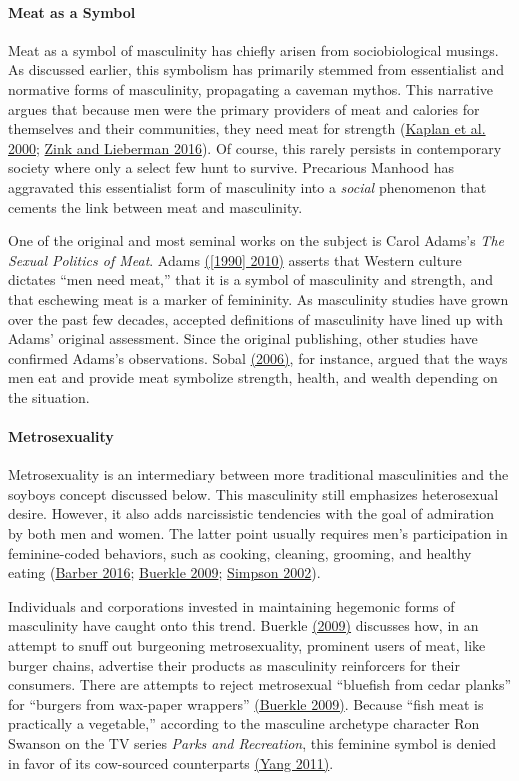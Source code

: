 \documentclass[twoside]{report}
\begin{document}
\paragraph{Meat as a Symbol}

Meat as a symbol of masculinity has chiefly arisen from sociobiological musings. As discussed earlier, this symbolism has primarily stemmed from essentialist and normative forms of masculinity, propagating a caveman mythos. This narrative argues that because men were the primary providers of meat and calories for themselves and their communities, they need meat for strength (\hyperlink{kaplan}{Kaplan et al. 2000}; \hyperlink{zink}{Zink and Lieberman 2016}). Of course, this rarely persists in contemporary society where only a select few hunt to survive. Precarious Manhood has aggravated this essentialist form of masculinity into a \textit{social} phenomenon that cements the link between meat and masculinity.

One of the original and most seminal works on the subject is Carol Adams's \emph{The Sexual Politics of Meat}. Adams \hyperlink{adams}{([1990] 2010)} asserts that Western culture dictates ``men need meat,'' that it is a symbol of masculinity and strength, and that eschewing meat is a marker of femininity. As masculinity studies have grown over the past few decades, accepted definitions of masculinity have lined up with Adams' original assessment. Since the original publishing, other studies have confirmed Adams's observations. Sobal \hyperlink{sobal}{(2006)}, for instance, argued that the ways men eat and provide meat symbolize strength, health, and wealth depending on the situation.

\paragraph{Metrosexuality}
Metrosexuality is an intermediary between more traditional masculinities and the soyboys concept discussed below. This masculinity still emphasizes heterosexual desire. However, it also adds narcissistic tendencies with the goal of admiration by both men and women. The latter point usually requires men's participation in feminine-coded behaviors, such as cooking, cleaning, grooming, and healthy eating (\hyperlink{barber1}{Barber 2016}; \hyperlink{buerkle}{Buerkle 2009}; \hyperlink{simpson}{Simpson 2002}).

Individuals and corporations invested in maintaining hegemonic forms of masculinity have caught onto this trend. Buerkle \hyperlink{buerkle}{(2009)} discusses how, in an attempt to snuff out burgeoning metrosexuality, prominent users of meat, like burger chains, advertise their products as masculinity
reinforcers for their consumers. There are attempts to reject
metrosexual ``bluefish from cedar planks'' for ``burgers from wax-paper wrappers'' \hyperlink{buerkle}{(Buerkle 2009)}. Because ``fish meat is practically a vegetable,'' according to the masculine archetype character Ron Swanson on the TV series \emph{Parks and Recreation}, this feminine symbol is denied in favor of its cow-sourced counterparts \hyperlink{yang}{(Yang 2011)}.
\end{document}
